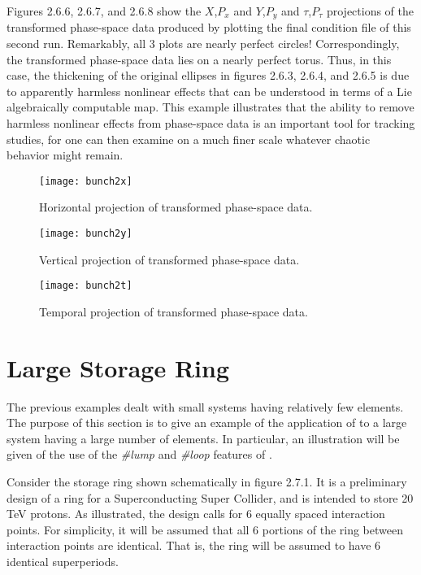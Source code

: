      Figures 2.6.6, 2.6.7, and 2.6.8 show the $X$,$P_x$  and $Y$,$P_y$  and $\tau$,$P_\tau$  projections of the
transformed phase-space data produced by plotting the final condition file
of this second \Mary run.  Remarkably, all 3 plots are nearly perfect
circles! Correspondingly, the transformed phase-space data lies on a nearly
perfect torus.  Thus, in this case, the thickening of the original ellipses
in figures 2.6.3, 2.6.4, and 2.6.5 is due to apparently harmless nonlinear effects that
can be understood in terms of a Lie algebraically computable map.  This
example illustrates that the ability to remove harmless nonlinear effects
from phase-space data is an important tool for tracking studies, for one
can then examine on a much finer scale whatever chaotic behavior might
remain.

\begin{figure}[hbp]
  \centering
  \texttt{[image: bunch2x]}
  \caption{Horizontal projection of transformed phase-space data.}
\end{figure}


\begin{figure}[hbp]
  \centering
  \texttt{[image: bunch2y]}
  \caption{Vertical projection of transformed phase-space data.}
\end{figure}


\begin{figure}[hbp]
  \centering
  \texttt{[image: bunch2t]}
  \caption{Temporal projection of transformed phase-space data.}
\end{figure}

\clearpage

\section{Large Storage Ring}
\label{largering}
     The previous examples dealt with small systems having relatively few
elements.  The purpose of this section is to give an example of the application
of \Mary to a large system having a large number of elements.  In
particular, an illustration will be given of the use of the {\em \#lump} and {\em \#loop}
features of \Maryend.

     Consider the storage ring shown schematically in figure 2.7.1.  It is a
preliminary design of a ring for a Superconducting Super Collider, and is
intended to store 20 TeV protons.  As illustrated, the design calls for 6
equally spaced interaction points.  For simplicity, it will be assumed that
all 6 portions of the ring between interaction points are identical.  That
is, the ring will be assumed to have 6 identical superperiods.

